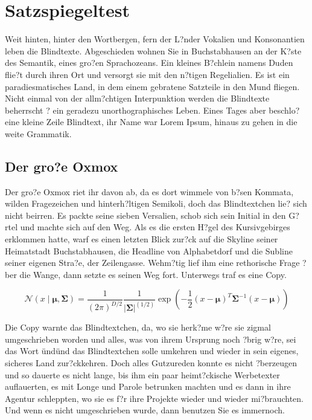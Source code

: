 \chapter{Satzspiegeltest}
\label{chap:satzspiegeltest}

Weit hinten, hinter den Wortbergen, fern der L?nder Vokalien und Konsonantien leben die Blindtexte. Abgeschieden wohnen Sie in Buchstabhausen an der K?ste des Semantik, eines gro?en Sprachozeans. Ein kleines B?chlein namens Duden flie?t durch ihren Ort und versorgt sie mit den n?tigen Regelialien. Es ist ein paradiesmatisches Land, in dem einem gebratene Satzteile in den Mund fliegen. Nicht einmal von der allm?chtigen Interpunktion werden die Blindtexte beherrscht ? ein geradezu unorthographisches Leben. Eines Tages aber beschlo? eine kleine Zeile Blindtext, ihr Name war Lorem Ipsum, hinaus zu gehen in die weite Grammatik.

\section{Der gro?e Oxmox}
\label{sec:satzspiegeltest_ombox}

Der gro?e Oxmox riet ihr davon ab, da es dort wimmele von b?sen Kommata, wilden Fragezeichen und hinterh?ltigen Semikoli, doch das Blindtextchen lie? sich nicht beirren. Es packte seine sieben Versalien, schob sich sein Initial in den G?rtel und machte sich auf den Weg. Als es die ersten H?gel des Kursivgebirges erklommen hatte, warf es einen letzten Blick zur?ck auf die Skyline seiner Heimatstadt Buchstabhausen, die Headline von Alphabetdorf und die Subline seiner eigenen Stra?e, der Zeilengasse. Wehm?tig lief ihm eine rethorische Frage ?ber die Wange, dann setzte es seinen Weg fort. Unterwegs traf es eine Copy.

\begin{equation}
	\mathcal{N}(x \mid \mathbold{\mu}, \mathbold{\Sigma}) = \frac{1}{(2\pi)^{D/2}} \frac{1}{|\mathbold{\Sigma}|^{(1/2)}} \exp \left( -\frac{1}{2}(x-\mathbold{\mu})^{T}\mathbold{\Sigma}^{-1}(x-\mathbold{\mu}) \right)
\end{equation}

Die Copy warnte das Blindtextchen, da, wo sie herk?me w?re sie zigmal umgeschrieben worden und alles, was von ihrem Ursprung noch ?brig w?re, sei das Wort \"und\" und das Blindtextchen solle umkehren und wieder in sein eigenes, sicheres Land zur?ckkehren. Doch alles Gutzureden konnte es nicht ?berzeugen und so dauerte es nicht lange, bis ihm ein paar heimt?ckische Werbetexter auflauerten, es mit Longe und Parole betrunken machten und es dann in ihre Agentur schleppten, wo sie es f?r ihre Projekte wieder und wieder mi?brauchten. Und wenn es nicht umgeschrieben wurde, dann benutzen Sie es immernoch.

